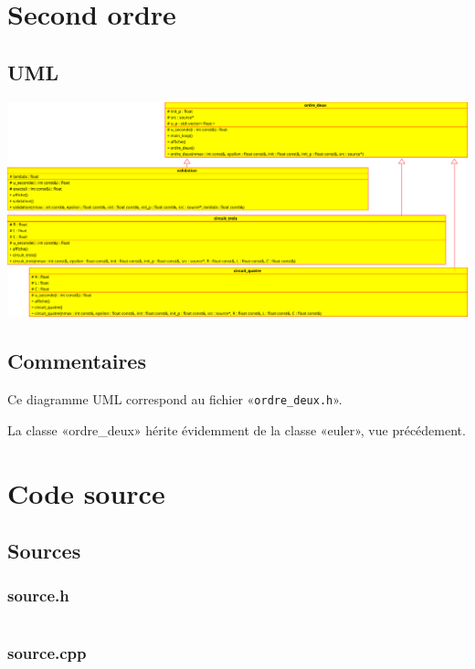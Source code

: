 \documentclass{report}
\begin{document}
\chapter{Second ordre}
    \begin{multicols}{2}
        \section{UML}
            \includegraphics[width=\linewidth+\linewidth,angle=90]{images/ordre_deux}

        \section{Commentaires}
            Ce diagramme UML correspond au fichier «\verb|ordre_deux.h|».

            La classe «ordre\_deux» hérite évidemment de la classe «euler», vue précédement.
    \end{multicols}



\appendix
\chapter{Code source}
\section{Sources}
\subsection{source.h}
\inputminted[linenos,fontsize=\scriptsize]{c++}{../src/source.h}
\subsection{source.cpp}
\inputminted[linenos,fontsize=\scriptsize]{c++}{../src/source.cpp}
\end{document}
